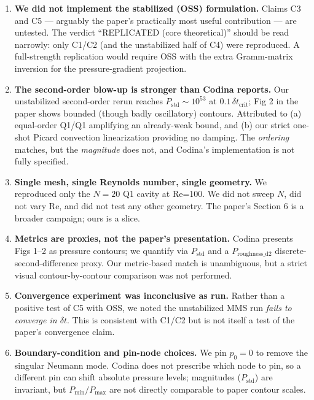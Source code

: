 \documentclass[11pt]{article}
\begin{document}
\begin{enumerate}
  \item \textbf{We did not implement the stabilized (OSS) formulation.}
        Claims C3 and C5 --- arguably the paper's practically most useful
        contribution --- are untested. The verdict ``REPLICATED (core
        theoretical)'' should be read narrowly: only C1/C2 (and the unstabilized
        half of C4) were reproduced. A full-strength replication would require
        OSS with the extra Gramm-matrix inversion for the pressure-gradient
        projection.

  \item \textbf{The second-order blow-up is stronger than Codina reports.}
        Our unstabilized second-order rerun reaches $P_{\text{std}} \sim 10^{53}$
        at $0.1\,\delta t_{\text{crit}}$; Fig 2 in the paper shows bounded
        (though badly oscillatory) contours. Attributed to (a) equal-order
        Q1/Q1 amplifying an already-weak bound, and (b) our strict one-shot
        Picard convection linearization providing no damping.
        The \emph{ordering} matches, but the \emph{magnitude} does not, and
        Codina's implementation is not fully specified.

  \item \textbf{Single mesh, single Reynolds number, single geometry.}
        We reproduced only the $N=20$ Q1 cavity at Re=100. We did not sweep
        $N$, did not vary Re, and did not test any other geometry. The paper's
        Section 6 is a broader campaign; ours is a slice.

  \item \textbf{Metrics are proxies, not the paper's presentation.}
        Codina presents Figs 1--2 as pressure contours; we quantify via
        $P_{\text{std}}$ and a $P_{\text{roughness\_d2}}$ discrete-second-difference
        proxy. Our metric-based match is unambiguous, but a strict visual
        contour-by-contour comparison was not performed.

  \item \textbf{Convergence experiment was inconclusive as run.}
        Rather than a positive test of C5 with OSS, we noted the unstabilized
        MMS run \emph{fails to converge in $\delta t$}. This is consistent with
        C1/C2 but is not itself a test of the paper's convergence claim.

  \item \textbf{Boundary-condition and pin-node choices.}
        We pin $p_0 = 0$ to remove the singular Neumann mode. Codina does not
        prescribe which node to pin, so a different pin can shift absolute
        pressure levels; magnitudes ($P_{\text{std}}$) are invariant, but
        $P_{\min}/P_{\max}$ are not directly comparable to paper contour scales.


\end{enumerate}
\end{document}
